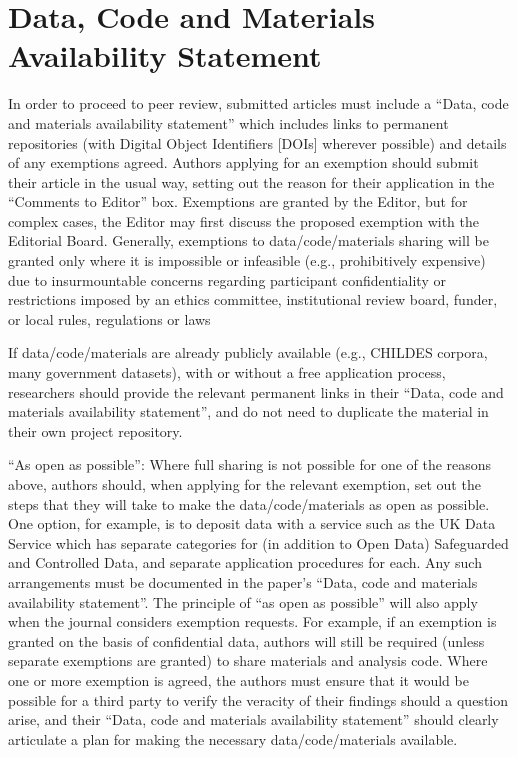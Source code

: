 \documentclass{ldr-article}
\begin{document}
\nocite{other2019references,kramer2019why,phillips2018yarrr}

\printbibliography


\section{Data, Code and Materials Availability Statement}
In order to proceed to peer review, submitted articles must include a “Data, code and materials availability statement” which includes links to permanent repositories (with Digital Object Identifiers [DOIs] wherever possible) and details of any exemptions agreed. Authors applying for an exemption should submit their article in the usual way, setting out the reason for their application in the “Comments to Editor” box. Exemptions are granted by the Editor, but for complex cases, the Editor may first discuss the proposed exemption with the Editorial Board. Generally, exemptions to data/code/materials sharing will be granted only where it is impossible or infeasible (e.g., prohibitively expensive) due to insurmountable concerns regarding participant confidentiality or restrictions imposed by an ethics committee, institutional review board, funder, or local rules, regulations or laws

If data/code/materials are already publicly available (e.g., CHILDES corpora, many government datasets), with or without a free application process, researchers should provide the relevant permanent links in their “Data, code and materials availability statement”, and do not need to duplicate the material in their own project repository.

 “As open as possible”: Where full sharing is not possible for one of the reasons above, authors should, when applying for the relevant exemption, set out the steps that they will take to make the data/code/materials as open as possible. One option, for example, is to deposit data with a service such as the UK Data Service which has separate categories for (in addition to Open Data) Safeguarded and Controlled Data, and separate application procedures for each. Any such arrangements must be documented in the paper’s “Data, code and materials availability statement”. The principle of “as open as possible” will also apply when the journal considers exemption requests. For example, if an exemption is granted on the basis of confidential data, authors will still be required (unless separate exemptions are granted) to share materials and analysis code. Where one or more exemption is agreed, the authors must ensure that it would be possible for a third party to verify the veracity of their findings should a question arise, and their “Data, code and materials availability statement” should clearly articulate a plan for making the necessary data/code/materials available.
\end{document}
